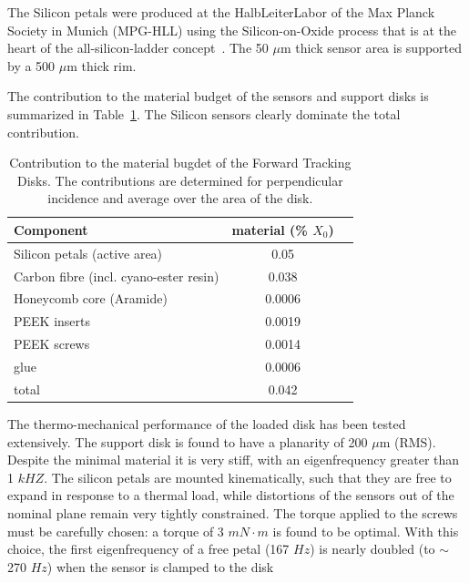 The Silicon petals were produced at the HalbLeiterLabor of the Max Planck Society in 
Munich (MPG-HLL) using the Silicon-on-Oxide process that is at the heart of the
all-silicon-ladder concept~\cite{Andricek:2004cj}. The 50 $\mu \mathrm{m}$ thick sensor area is supported by a 500 $\mu \mathrm{m}$ thick rim.

The contribution to the material budget of the sensors and support disks is 
summarized in Table~\ref{tab:ftd_disk_material_budget}. The Silicon sensors clearly
dominate the total contribution.

\begin{table}[]
    \centering
    \begin{tabular}{l|c|c}
    Component                      & material (\% $X_0$) \\ \hline
    Silicon petals (active area)  &         0.05 \\
    Carbon fibre (incl. cyano-ester resin)     &   0.038 \\
    Honeycomb core (Aramide)      &   0.0006 \\
    PEEK inserts                  &   0.0019 \\
    PEEK screws                   &   0.0014 \\
    glue                          &   0.0006  \\ \hline
    total                         &     0.042      \\ \hline
    \end{tabular}
    \caption{Contribution to the material bugdet of the Forward Tracking Disks. The contributions are determined for perpendicular incidence and average over the area
    of the disk.}
    \label{tab:ftd_disk_material_budget}
\end{table}

The thermo-mechanical performance of the loaded disk has been tested extensively. The 
support disk is found to have a planarity of 200 $\mu \mathrm{m}$ (RMS). Despite the 
minimal material it is very stiff, with an eigenfrequency greater than 1 $kHZ$. The
silicon petals are mounted kinematically, such that they are free to expand in response
to a thermal load, while distortions of the sensors out of the nominal plane remain
very tightly constrained. The torque applied to the screws must be carefully 
chosen: a torque of 3 $mN \cdot m$ is found to be optimal. 
With this choice, the first eigenfrequency of a free petal (167 $Hz$) is nearly
doubled (to $\sim$ 270 $Hz$) when the sensor is clamped to the disk 

